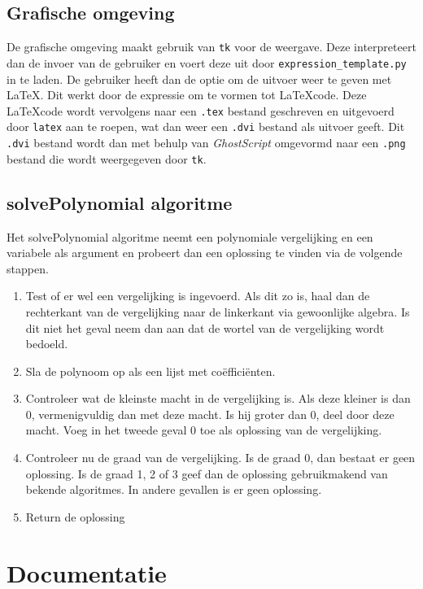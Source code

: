 \documentclass[a4paper]{article}
\newcommand{\ttt}[1]{\texttt{#1}}
\begin{document}
\subsection{Grafische omgeving}
De grafische omgeving maakt gebruik van  \ttt{tk} voor de weergave. Deze interpreteert dan de invoer van de gebruiker en voert deze uit door \ttt{expression\_template.py} in te laden. De gebruiker heeft dan de optie om de uitvoer weer te geven met \LaTeX. Dit werkt door de expressie om te vormen tot \LaTeX code. Deze \LaTeX code wordt vervolgens naar een \ttt{.tex} bestand geschreven en uitgevoerd door \ttt{latex} aan te roepen, wat dan weer een \ttt{.dvi} bestand als uitvoer geeft. Dit \ttt{.dvi} bestand wordt dan met behulp van \textit{GhostScript} omgevormd naar een \ttt{.png} bestand die wordt weergegeven door \ttt{tk}.


\subsection{solvePolynomial algoritme}
Het solvePolynomial algoritme neemt een polynomiale vergelijking en een variabele als argument en probeert dan een oplossing te vinden via de volgende stappen.
\begin{enumerate}
\item Test of er wel een vergelijking is ingevoerd. Als dit zo is, haal dan de rechterkant van de vergelijking naar de linkerkant via gewoonlijke algebra. Is dit niet het geval neem dan aan dat de wortel van de vergelijking wordt bedoeld.
\item Sla de polynoom op als een lijst met co\"effici\"enten. 
\item Controleer wat de kleinste macht in de vergelijking is. Als deze kleiner is dan 0, vermenigvuldig dan met deze macht. Is hij groter dan 0, deel door deze macht. Voeg in het tweede geval 0 toe als oplossing van de vergelijking.
\item Controleer nu de graad van de vergelijking. Is de graad 0, dan bestaat er geen oplossing. Is de graad 1, 2 of 3 geef dan de oplossing gebruikmakend van bekende algoritmes. In andere gevallen is er geen oplossing.
\item Return de oplossing
\end{enumerate}

\section{Documentatie}
\end{document}
